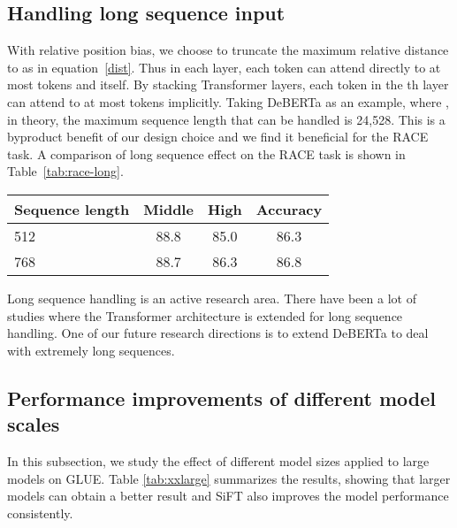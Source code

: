 \documentclass{article}
\def\eqref#1{equation~\ref{#1}}
\newcommand\ModelName{DeBERTa}
\begin{document}
\subsection{Handling long sequence input}
With relative position bias, we choose to truncate the maximum relative distance to  as  in \eqref{dist}. Thus in each layer, each token can attend directly to at most  tokens and itself. By stacking Transformer layers, each token in the th layer can attend to at most  tokens implicitly. Taking {\ModelName} as an example, where , in theory, the maximum sequence length that can be handled is 24,528. This is a byproduct benefit of our design choice and we find it beneficial for the RACE task. 
A comparison of long sequence effect on the RACE task is shown in Table~\ref{tab:race-long}.

\begin{table*}[htb!]
    \centering
    \begin{tabular}{@{\hskip2pt}l@{\hskip3pt}|@{\hskip2pt} c@{\hskip2pt}| @{\hskip2pt}c@{\hskip2pt}| @{\hskip2pt}c@{\hskip2pt}}
        \toprule
        Sequence length& Middle &High &Accuracy \\
        \midrule
        512 & 88.8 & 85.0 & 86.3 \\
        768 & 88.7 & 86.3 & 86.8 \\
        \bottomrule
    \end{tabular}
    \caption{
    The effect of handling long sequence input for RACE task with DeBERTa
    }
    \label{tab:race-long}
\end{table*}

Long sequence handling is an active research area. There have been a lot of studies where the Transformer architecture is extended for long sequence handling\citep{beltagy2020longformer, kitaev2020reformer, child2019generating, dai2019transformer}.  
One of our future research directions is to extend {\ModelName} to deal with extremely long sequences.


\subsection{Performance improvements of different model scales}
\label{subsec:scale}
In this subsection, we study the effect of different model sizes  applied to large models on GLUE. Table \ref{tab:xxlarge} summarizes the results,  showing that larger models can obtain a better result and SiFT also improves the model performance consistently.
\end{document}
